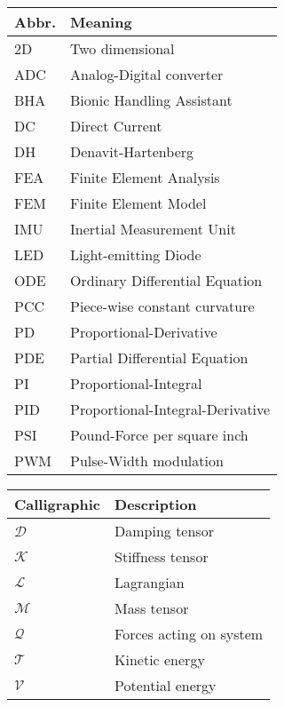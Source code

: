 \begin{spacing}{0.9}
\begin{multicols}{2}
\begin{table}[H]
\centering
    \begin{tabular}{p{1.5cm} p{5cm}} \hline
    \textbf{Abbr.}    &   \textbf{Meaning }\\ \hline
    2D       & Two dimensional \\
    ADC     &  Analog-Digital converter\\
    BHA    &  Bionic Handling Assistant\\
    DC    &  Direct Current\\
    DH    &  Denavit-Hartenberg\\
    FEA     &  Finite Element Analysis \\
    FEM     &  Finite Element Model \\
    IMU    & Inertial Measurement Unit \\
    LED   & Light-emitting Diode \\
    ODE   & Ordinary Differential Equation \\
    PCC   & Piece-wise constant curvature \\
    PD    & Proportional-Derivative \\
    PDE    & Partial Differential Equation \\
    PI   & Proportional-Integral \\
    PID   & Proportional-Integral-Derivative\\
    PSI    & Pound-Force per square inch\\
    PWM    & Pulse-Width modulation\\  \hline
    \end{tabular}
\end{table}



\begin{table}[H]
\centering
    \begin{tabular}{p{2.5cm} p{4cm}} \hline
    \textbf{Calligraphic}    &   \textbf{Description }\\ \hline

    $\mathcal{D}$     &  Damping tensor \\
    $\mathcal{K}$     &  Stiffness tensor \\
    $\mathcal{L}$     &  Lagrangian \\
    $\mathcal{M}$     &  Mass tensor \\
    $\mathcal{Q}$     &  Forces acting on system \\
    $\mathcal{T}$     &  Kinetic energy \\
    $\mathcal{V}$     &  Potential energy \\ \hline


\end{tabular}
\end{table}
\end{multicols}
\end{spacing}
